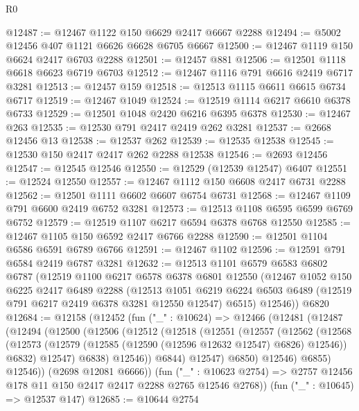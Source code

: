 \begin{lexlean}{R0}
\begin{coremodule}
@12487 := @12467 @1122 @150 @6629 @2417 @6667 @2288
@12494 := @5002 @12456 @407 @1121 @6626 @6628 @6705 @6667
@12500 := @12467 @1119 @150 @6624 @2417 @6703 @2288
@12501 := @12457 @881
@12506 := @12501 @1118 @6618 @6623 @6719 @6703
@12512 := @12467 @1116 @791 @6616 @2419 @6717 @3281
@12513 := @12457 @159
@12518 := @12513 @1115 @6611 @6615 @6734 @6717
@12519 := @12467 @1049
@12524 := @12519 @1114 @6217 @6610 @6378 @6733
@12529 := @12501 @1048 @2420 @6216 @6395 @6378
@12530 := @12467 @263
@12535 := @12530 @791 @2417 @2419 @262 @3281
@12537 := @2668 @12456 @13
@12538 := @12537 @262
@12539 := @12535 @12538
@12545 := @12530 @150 @2417 @2417 @262 @2288 @12538
@12546 := @2693 @12456
@12547 := @12545 @12546
@12550 := @12529 (@12539 @12547) @6407
@12551 := @12524 @12550
@12557 := @12467 @1112 @150 @6608 @2417 @6731 @2288
@12562 := @12501 @1111 @6602 @6607 @6754 @6731
@12568 := @12467 @1109 @791 @6600 @2419 @6752 @3281
@12573 := @12513 @1108 @6595 @6599 @6769 @6752
@12579 := @12519 @1107 @6217 @6594 @6378 @6768 @12550
@12585 := @12467 @1105 @150 @6592 @2417 @6766 @2288
@12590 := @12501 @1104 @6586 @6591 @6789 @6766
@12591 := @12467 @1102
@12596 := @12591 @791 @6584 @2419 @6787 @3281
@12632 := @12513
    @1101
    @6579
    @6583
    @6802
    @6787
    (@12519
      @1100
      @6217
      @6578
      @6378
      @6801
      @12550
      (@12467
        @1052
        @150
        @6225
        @2417
        @6489
        @2288
        (@12513
          @1051
          @6219
          @6224
          @6503
          @6489
          (@12519 @791 @6217 @2419 @6378 @3281 @12550 @12547)
          @6515)
        @12546))
    @6820
@12684 := @12158
    (@12452
      (fun ("_" : @10624) =>
      @12466
        (@12481
          (@12487
            (@12494
              (@12500
                (@12506
                  (@12512
                    (@12518
                      (@12551
                        (@12557
                          (@12562
                            (@12568
                              (@12573
                                (@12579 (@12585 (@12590 (@12596 @12632 @12547) @6826) @12546))
                                @6832)
                              @12547)
                            @6838)
                          @12546))
                      @6844)
                    @12547)
                  @6850)
                @12546)
              @6855)
            @12546))
        (@2698 @12081 @6666))
      (fun ("_" : @10623 @2754) => @2757 @12456 @178 @11 @150 @2417 @2417 @2288 @2765 @12546 @2768))
    (fun ("_" : @10645) => @12537 @147)
@12685 := @10644 @2754

\end{coremodule}
\end{lexlean}
